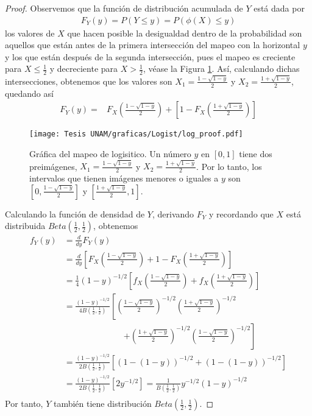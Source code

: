 \documentclass[../Main.tex]{subfiles}
\begin{document}
\begin{proof}
Observemos que la función de distribución acumulada de $Y$ está dada por \begin{align*}
    F_Y(y)=P(Y\leq y)=P(\phi(X)\leq y)
\end{align*}
los valores de $X$ que hacen posible la desigualdad dentro de la probabilidad son aquellos que están antes de la primera intersección del mapeo con la horizontal $y$ y los que están después de la segunda intersección, pues el mapeo es creciente para $X\leq \frac{1}{2}$ y decreciente para $X>\frac{1}{2}$, véase la Figura \ref{fig:log_proof}. Así, calculando dichas intersecciones, obtenemos que los valores son $X_1=\frac{1-\sqrt{1-y}}{2}$ y $X_2=\frac{1+\sqrt{1-y}}{2}$, quedando así 
\begin{align*}
    F_Y(y)=&F_X\left(\frac{1-\sqrt{1-y}}{2}\right)+\left[1-F_X\left(\frac{1+\sqrt{1-y}}{2}\right)\right]
\end{align*}

\begin{figure}[h]
    \centering
    \texttt{[image: Tesis UNAM/graficas/Logist/log\_proof.pdf]}
    \caption{Gráfica del mapeo de logisitico. Un número $y$ en $[0,1]$ tiene dos preimágenes, $X_1=\frac{1-\sqrt{1-y}}{2}$ y $X_2=\frac{1+\sqrt{1-y}}{2}$. Por lo tanto, los intervalos que tienen imágenes menores o iguales a $y$ son $\left[0,\frac{1-\sqrt{1-y}}{2}\right]$ y $\left[\frac{1+\sqrt{1-y}}{2},1\right]$.}
    \label{fig:log_proof}
\end{figure} 


Calculando la función de densidad de $Y$, derivando $F_Y$ y recordando que $X$ está distribuida $Beta\left(\frac{1}{2},\frac{1}{2}\right)$, obtenemos
\begin{align*}
f_Y(y) &= \frac{d}{dy} F_Y(y) \\
       &= \frac{d}{dy} \left[ F_X\left( \frac{1 - \sqrt{1 - y}}{2} \right) + 1 - F_X\left( \frac{1 + \sqrt{1 - y}}{2} \right) \right] \\
       &= \frac{1}{4} (1 - y)^{-1/2} \left[ f_X\left( \frac{1 - \sqrt{1 - y}}{2} \right) + f_X\left( \frac{1 + \sqrt{1 - y}}{2} \right) \right] \\
       &= \frac{(1 - y)^{-1/2}}{4B\left( \frac{1}{2}, \frac{1}{2} \right)} \left[ \left( \frac{1 - \sqrt{1 - y}}{2} \right)^{-1/2}\left( \frac{1 + \sqrt{1 - y}}{2} \right)^{-1/2} \right. \\
       & \qquad\qquad\qquad\quad \left. + \left( \frac{1 + \sqrt{1 - y}}{2} \right)^{-1/2}\left( \frac{1 - \sqrt{1 - y}}{2} \right)^{-1/2} \right] \\
       &= \frac{(1 - y)^{-1/2}}{2B\left( \frac{1}{2}, \frac{1}{2} \right)} \left[ \left( 1 - (1 - y) \right)^{-1/2} + \left( 1 - (1 - y) \right)^{-1/2} \right] \\
       &= \frac{(1 - y)^{-1/2}}{2B\left( \frac{1}{2}, \frac{1}{2} \right)} \left[ 2y^{-1/2} \right]=  \frac{1}{B\left( \frac{1}{2}, \frac{1}{2} \right)}  y^{-1/2}(1 - y)^{-1/2} \\
\end{align*}
 Por tanto, $Y$ también tiene distribución $Beta\left(\frac{1}{2},\frac{1}{2}\right)$. 
\end{proof}
\end{document}
